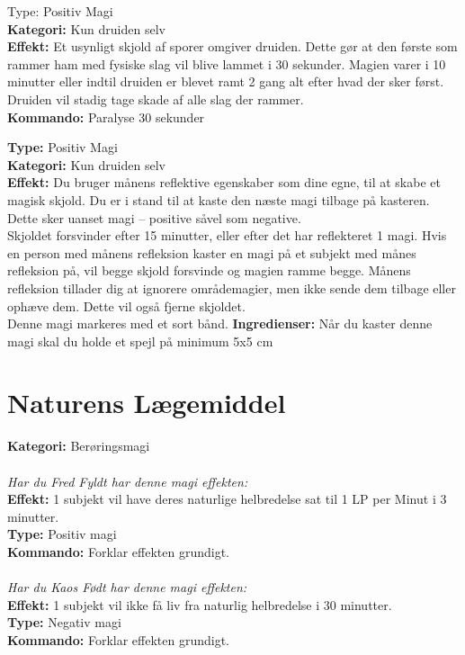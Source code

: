 \begin{nBeskyt*}[Pollenskjold]
Type: Positiv Magi  \\
\textbf{Kategori:} Kun druiden selv\\
\textbf{Effekt:} Et usynligt skjold af sporer omgiver druiden. Dette gør at den første som rammer ham med fysiske slag vil blive lammet i 30 sekunder. Magien varer i 10 minutter eller indtil druiden er blevet ramt 2 gang alt efter hvad der sker først. Druiden vil stadig tage skade af alle slag der rammer.\\
\textbf{Kommando:} Paralyse 30 sekunder
\end{nBeskyt*}

\begin{nBeskyt*}
\textbf{Type:} Positiv Magi\\ 
\textbf{Kategori:} Kun druiden selv\\
\textbf{Effekt:} Du bruger månens reflektive egenskaber som dine egne, til at skabe et magisk skjold. Du er i stand til at kaste den næste magi tilbage på kasteren. Dette sker uanset magi – positive såvel som negative.\\
Skjoldet forsvinder efter 15 minutter, eller efter det har reflekteret 1 magi. Hvis en person med månens refleksion kaster en magi på et subjekt med månes refleksion på, vil begge skjold forsvinde og magien ramme begge. Månens refleksion tillader dig at ignorere områdemagier, men ikke sende dem tilbage
eller ophæve dem. Dette vil også fjerne skjoldet.\\
Denne magi markeres med et sort bånd.
\textbf{Ingredienser:} Når du kaster denne magi skal du holde et spejl på minimum 5x5 cm
\end{nBeskyt*}

\newpage
\section{Naturens Lægemiddel}
\begin{nvit*}
\textbf{Kategori:} Berøringsmagi \\
\\
\emph{\textit{Har du Fred Fyldt har denne magi effekten:}}\\
\textbf{Effekt:} 1 subjekt vil have deres naturlige helbredelse sat til 1 LP per Minut i 3 minutter.\\
\textbf{Type:} Positiv magi \\
\textbf{Kommando:} Forklar effekten grundigt.\\
\\
\emph{\textit{Har du Kaos Født har denne magi effekten:}}\\
\textbf{Effekt:} 1 subjekt vil ikke få liv fra naturlig helbredelse i 30 minutter.\\
\textbf{Type:} Negativ magi \\
\textbf{Kommando:} Forklar effekten grundigt.\\
\end{nvit*}

